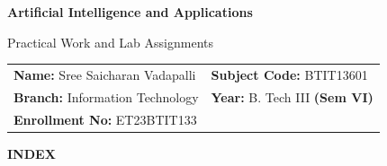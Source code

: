 \documentclass[11pt, a4paper]{article}
\begin{document}

\vspace*{0.8cm}

{\fontsize{22pt}{26pt}\selectfont\bfseries Artificial Intelligence and Applications}

\vspace{0.3cm}
{\large\color{gray} Practical Work and Lab Assignments}

\vspace{1cm}

\begin{tabular}{@{}p{} p{}@{}}
  \textbf{Name:} Sree Saicharan Vadapalli   & \quad \quad \quad \quad \textbf{Subject Code:} BTIT13601 \\[4pt]
  \textbf{Branch:} Information Technology   & \quad \quad \quad \quad \textbf{Year:} B. Tech III \textbf{(Sem VI)} \\[4pt]
  \textbf{Enrollment No:} ET23BTIT133       & \\
\end{tabular}

\vspace{1.5cm}


\begin{center}
  {\large\bfseries INDEX}
\end{center}

\vspace{0.5cm}


\renewcommand{\arraystretch}{1.6}
\end{document}
